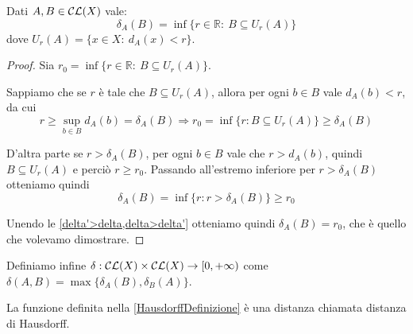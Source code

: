 \begin{lemma}
	Dati $A,B\in \mathcal{CL}(X)$ vale:
	\begin{equation*}
		\delta_A(B)=\inf\{r\in\mathbb{R}:\ B\subseteq U_r(A)\}
	\end{equation*}
	dove $U_r(A)=\{x\in X :\ d_A(x)<r \}$.
\end{lemma}
\begin{proof}
	Sia $r_0=\inf\{r\in\mathbb{R}:\ B\subseteq U_r(A)\}$.
	
	Sappiamo che se $r$ è tale che $B\subseteq U_r(A)$, allora per ogni $b\in B$ vale $d_A(b)<r$, da cui
	\begin{equation}\label{delta'>delta}
		r\ge \sup_{b\in B} d_A(b)=\delta_A(B) \Longrightarrow r_0=\inf\{r:B\subseteq U_r(A) \}\ge \delta_A(B)
	\end{equation}
	
	D'altra parte se $r>\delta_A(B)$, per ogni $b\in B$ vale che $r>d_A(b)$, quindi $B\subseteq U_r(A)$ e perciò $r\ge r_0$. Passando all'estremo inferiore per $r>\delta_A(B)$ otteniamo quindi
	\begin{equation}\label{delta>delta'}
		\delta_A(B)=\inf\{r:r>\delta_A(B)\}\ge r_0
	\end{equation}
	
	Unendo le \cref{delta'>delta,delta>delta'} otteniamo quindi $\delta_A(B)=r_0$, che è quello che volevamo dimostrare.
\end{proof}




\begin{definition}\label{HausdorffDefinizione}
	Definiamo infine $\delta:\mathcal{CL}(X)\times \mathcal{CL}(X) \to [0,+\infty)$ come $\delta(A,B)=\max\{ \delta_A(B),\delta_B(A) \}$.
\end{definition}

\begin{theorem}
	La funzione definita nella \cref{HausdorffDefinizione} è una distanza chiamata distanza di Hausdorff.
\end{theorem}

